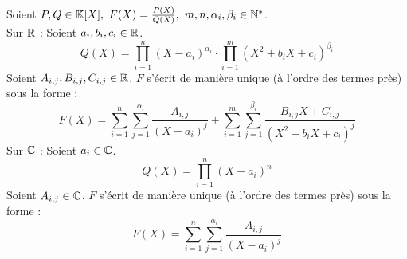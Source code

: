 \begin{theorem}
	Soient $P, Q \in \mathbb{K}[X],\ F(X) = \frac{P(X)}{Q(X)},\ m, n, \alpha_i, \beta_i \in \mathbb{N}^*$.
	\\
	Sur $\mathbb{R}$ : Soient $a_i, b_i, c_i \in \mathbb{R}$.
	\[ Q(X) = \prod_{i = 1}^{n} (X - a_i)^{\alpha_i} \cdot \prod_{i = 1}^{m} (X^2 + b_i X + c_i)^{\beta_i} \]
	Soient $A_{i, j}, B_{i, j}, C_{i, j} \in \mathbb{R}$. $F$ s'écrit de manière unique (à l'ordre des termes près) sous la forme :
	\[ F(X) = \sum_{i = 1}^{n} \sum_{j = 1}^{\alpha_i} \frac{A_{i, j}}{\left(X - a_i\right)^{j}} + \sum_{i = 1}^{m} \sum_{j = 1}^{\beta_i} \frac{B_{i, j}X + C_{i, j}}{(X^2 + b_iX + c_i)^{j}} \]
	Sur $\mathbb{C}$ : Soient $a_i \in \mathbb{C}$.
	\[ Q(X) = \prod_{i = 1}^{n} (X - a_i)^{n} \]
	Soient $A_{i, j} \in \mathbb{C}$. $F$ s'écrit de manière unique (à l'ordre des termes près) sous la forme :
	\[ F(X) = \sum_{i = 1}^{n} \sum_{j = 1}^{\alpha_i} \frac{A_{i, j}}{\left(X - a_i\right)^{j}} \]
\end{theorem}

